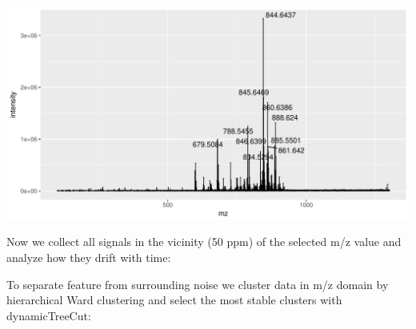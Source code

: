 \documentclass[]{article}
\newenvironment{Shaded}{\begin{snugshade}}{\end{snugshade}}
\newcommand{\KeywordTok}[1]{\textcolor[rgb]{0.13,0.29,0.53}{\textbf{#1}}}
\newcommand{\FloatTok}[1]{\textcolor[rgb]{0.00,0.00,0.81}{#1}}
\newcommand{\StringTok}[1]{\textcolor[rgb]{0.31,0.60,0.02}{#1}}
\newcommand{\OperatorTok}[1]{\textcolor[rgb]{0.81,0.36,0.00}{\textbf{#1}}}
\newcommand{\NormalTok}[1]{#1}
\begin{document}
\includegraphics{Supplementary_document_files/figure-latex/ion.plots.602-1.pdf}

Now we collect all signals in the vicinity (50 ppm) of the selected m/z
value and analyze how they drift with time:

\begin{Shaded}
\end{Shaded}

To separate feature from surrounding noise we cluster data in m/z domain
by hierarchical Ward clustering and select the most stable clusters with
dynamicTreeCut:
\end{document}
